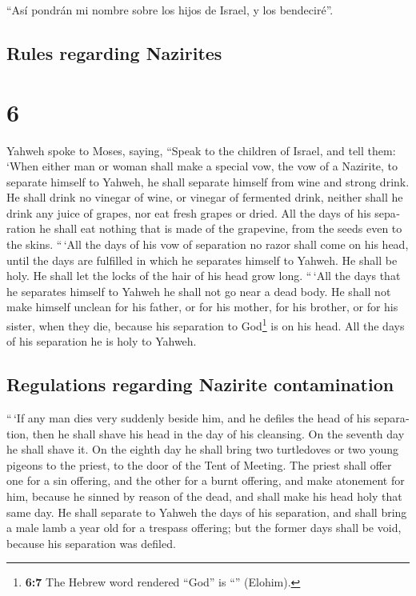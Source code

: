 \begin{paracol}{2}
 ``Así pondrán mi nombre sobre los hijos de Israel, y los
bendeciré''.

\switchcolumn
\begin{otherlanguage}{english}

\hypertarget{rules-regarding-nazirites}{%
\subsection{Rules regarding Nazirites}\label{rules-regarding-nazirites}}

\hypertarget{section-11}{%
\section{6}\label{section-11}}

 Yahweh spoke to Moses, saying,  ``Speak to
the children of Israel, and tell them: `When either man or woman shall
make a special vow, the vow of a Nazirite, to separate himself to
Yahweh,  he shall separate himself from wine and strong
drink. He shall drink no vinegar of wine, or vinegar of fermented drink,
neither shall he drink any juice of grapes, nor eat fresh grapes or
dried.  All the days of his separation he shall eat
nothing that is made of the grapevine, from the seeds even to the skins.
 ``\,`All the days of his vow of separation no razor shall
come on his head, until the days are fulfilled in which he separates
himself to Yahweh. He shall be holy. He shall let the locks of the hair
of his head grow long.  ``\,`All the days that he
separates himself to Yahweh he shall not go near a dead body.
 He shall not make himself unclean for his father, or for
his mother, for his brother, or for his sister, when they die, because
his separation to God\footnote{\textbf{6:7} The Hebrew word rendered
  ``God'' is ``'' (Elohim).} is on his head.
 All the days of his separation he is holy to Yahweh.

\hypertarget{regulations-regarding-nazirite-contamination}{%
\subsection{Regulations regarding Nazirite
contamination}\label{regulations-regarding-nazirite-contamination}}

 ``\,`If any man dies very suddenly beside him, and he
defiles the head of his separation, then he shall shave his head in the
day of his cleansing. On the seventh day he shall shave it.
 On the eighth day he shall bring two turtledoves or two
young pigeons to the priest, to the door of the Tent of Meeting.
 The priest shall offer one for a sin offering, and the
other for a burnt offering, and make atonement for him, because he
sinned by reason of the dead, and shall make his head holy that same
day.  He shall separate to Yahweh the days of his
separation, and shall bring a male lamb a year old for a trespass
offering; but the former days shall be void, because his separation was
defiled.


\end{otherlanguage}
\end{paracol}
